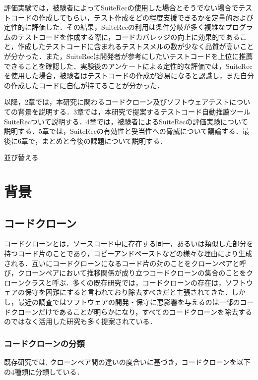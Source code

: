 \documentclass[12pt]{jarticle} %
\begin{document}
評価実験では，被験者によって{\sf SuiteRec}の使用した場合とそうでない場合でテストコードの作成してもらい，テスト作成をどの程度支援できるかを定量的および定性的に評価した．その結果，{\sf SuiteRec}の利用は条件分岐が多く複雑なプログラムのテストコードを作成する際に，コードカバレッジの向上に効果的であること，作成したテストコードに含まれるテストスメルの数が少なく品質が高いことが分かった．また，{\sf SuiteRec}は開発者が参考にしたいテストコードを上位に推薦できることを確認した．実験後のアンケートによる定性的な評価では，{\sf SuiteRec}を使用した場合，被験者はテストコードの作成が容易になると認識し，また自分の作成したコードに自信が持てることが分かった．

以降，2章では，本研究に関わるコードクローン及びソフトウェアテストについての背景を説明する．3章では，本研究で提案するテストコード自動推薦ツール{\sf SuiteRec}ついて説明する．4章では，被験者による{\sf SuiteRec}の評価実験について説明する．5章では，{\sf SuiteRec}の有効性と妥当性への脅威について議論する．最後に6章で，まとめと今後の課題について説明する．

並び替える
\newpage
\section{背景}
\subsection{コードクローン}

コードクローンとは，ソースコード中に存在する同一，あるいは類似した部分を持つコード片のことであり，コピーアンドペーストなどの様々な理由により生成される\cite{c1}．互いにコードクローンになるコード片の対のことをクローンペアと呼び，クローンペアにおいて推移関係が成り立つコードクローンの集合のことをクローンクラスと呼ぶ．多くの既存研究\cite{c2,c3,c1}では，コードクローンの存在は，ソフトウェアの保守を困難にすると言われており除去すべきだと主張されてきた．しかし，最近の調査ではソフトウェアの開発・保守に悪影響を与えるのは一部のコードクローンだけであることが明らかになり，すべてのコードクローンを除去するのではなく活用した研究も多く提案されている．

\subsubsection{コードクローンの分類}
既存研究\cite{c5,c4}では, クローンペア間の違いの度合いに基づき，コードクローンを以下の4種類に分類している．
\end{document}
